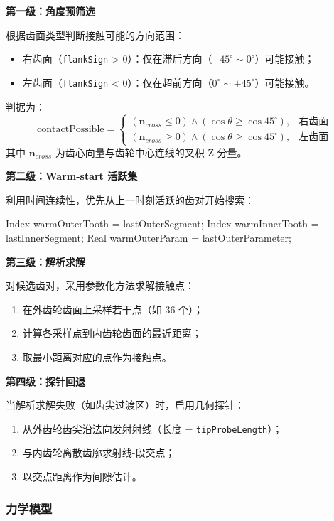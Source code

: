 \documentclass[12pt]{ctexart}
\begin{document}
\textbf{第一级：角度预筛选}

根据齿面类型判断接触可能的方向范围：
\begin{itemize}
  \item 右齿面（\verb|flankSign| > 0）：仅在滞后方向（$-45^\circ\sim 0^\circ$）可能接触；
  \item 左齿面（\verb|flankSign| < 0）：仅在超前方向（$0^\circ\sim +45^\circ$）可能接触。
\end{itemize}

判据为：
\begin{equation}
\text{contactPossible} = \begin{cases}
(\mathbf{n}_{cross} \leq 0) \land (\cos\theta \geq \cos 45^\circ), & \text{右齿面} \\
(\mathbf{n}_{cross} \geq 0) \land (\cos\theta \geq \cos 45^\circ), & \text{左齿面}
\end{cases}
\end{equation}
其中 $\mathbf{n}_{cross}$ 为齿心向量与齿轮中心连线的叉积 Z 分量。

\textbf{第二级：Warm-start 活跃集}

利用时间连续性，优先从上一时刻活跃的齿对开始搜索：

\begin{cppcode}
Index warmOuterTooth = lastOuterSegment;
Index warmInnerTooth = lastInnerSegment;
Real warmOuterParam = lastOuterParameter;
\end{cppcode}

\textbf{第三级：解析求解}

对候选齿对，采用参数化方法求解接触点：
\begin{enumerate}
  \item 在外齿轮齿面上采样若干点（如 36 个）；
  \item 计算各采样点到内齿轮齿面的最近距离；
  \item 取最小距离对应的点作为接触点。
\end{enumerate}

\textbf{第四级：探针回退}

当解析求解失败（如齿尖过渡区）时，启用几何探针：
\begin{enumerate}
  \item 从外齿轮齿尖沿法向发射射线（长度 = \verb|tipProbeLength|）；
  \item 与内齿轮离散齿廓求射线-段交点；
  \item 以交点距离作为间隙估计。
\end{enumerate}

\subsubsection{力学模型}
\end{document}
